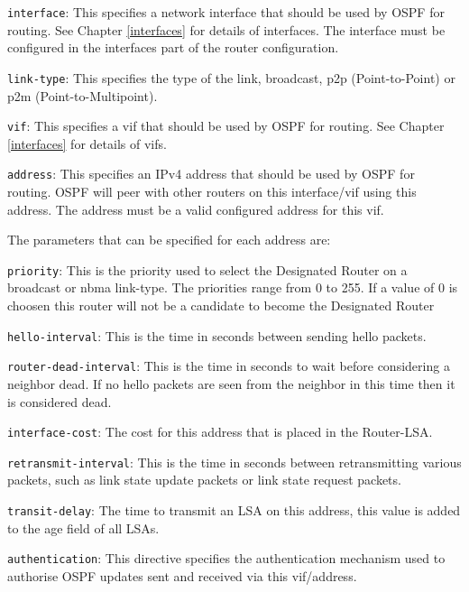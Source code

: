 \begin{description}
\begin{description}
\item{\tt interface}: This specifies a network interface that should
  be used by OSPF for routing.  See Chapter \ref{interfaces} for
  details of interfaces.  The interface must be configured
  in the {\stt interfaces} part of the router configuration.
\begin{description}
\item{\tt link-type}: This specifies the type of the link, {\stt
broadcast}, {\stt p2p} (Point-to-Point) or {\stt p2m} (Point-to-Multipoint).
\begin{description}
\item{\tt vif}: This specifies a vif that should be used by OSPF for routing.
  See Chapter \ref{interfaces} for details of vifs.
\begin{description}
\item{\tt address}: This specifies an IPv4 address that should be used
  by OSPF for routing.  OSPF will peer with other routers on this {\stt
  interface/vif} using this {\stt address}.  The address must be a
  valid configured address for this vif.

  The parameters that can be specified for each address are:
\begin{description}
\item{\tt priority}: This is the priority used to select the
Designated Router on a {\stt broadcast} or {\stt nbma} {\stt
link-type}. The priorities range from 0 to 255. If a value of 0 is
choosen this router will not be a candidate to become the Designated Router
\item{\tt hello-interval}: This is the time in seconds between sending
hello packets.
\item{\tt router-dead-interval}: This is the time in seconds to wait before
considering a neighbor dead. If no hello packets are seen from the
neighbor in this time then it is considered dead.
\item{\tt interface-cost}: The cost for this address that is placed in
the Router-LSA.
\item{\tt retransmit-interval}:  This is the time in seconds between
retransmitting various packets, such as link state update packets or
link state request packets.
\item{\tt transit-delay}: The time to transmit an LSA on this address,
this value is added to the age field of all LSAs.

\item{\tt authentication}: This directive specifies the authentication
mechanism used to authorise OSPF updates sent and received via this
vif/address.  


\end{description}
\end{description}
\end{description}
\end{description}
\end{description}
\end{description}
